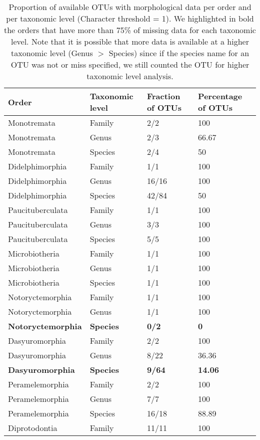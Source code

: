 \begin{longtable}{llll}
\caption{Proportion of available OTUs with morphological data per order and per taxonomic level (Character threshold = 1). We highlighted in bold the orders that have more than 75\% of missing data for each taxonomic level. Note that it is possible that more data is available at a higher taxonomic level (Genus $>$ Species) since if the species name for an OTU was not or miss specified, we still counted the OTU for higher taxonomic level analysis.} \\ 
  \hline
Order & Taxonomic level & Fraction of OTUs & Percentage of OTUs \\ 
  \hline
Monotremata & Family & 2/2 & 100 \\ 
  Monotremata & Genus & 2/3 & 66.67 \\ 
  Monotremata & Species & 2/4 & 50 \\ 
  Didelphimorphia & Family & 1/1 & 100 \\ 
  Didelphimorphia & Genus & 16/16 & 100 \\ 
  Didelphimorphia & Species & 42/84 & 50 \\ 
  Paucituberculata & Family & 1/1 & 100 \\ 
  Paucituberculata & Genus & 3/3 & 100 \\ 
  Paucituberculata & Species & 5/5 & 100 \\ 
  Microbiotheria & Family & 1/1 & 100 \\ 
  Microbiotheria & Genus & 1/1 & 100 \\ 
  Microbiotheria & Species & 1/1 & 100 \\ 
  Notoryctemorphia & Family & 1/1 & 100 \\ 
  Notoryctemorphia & Genus & 1/1 & 100 \\ 
  \textbf{Notoryctemorphia} & \textbf{Species} & \textbf{0/2} & \textbf{0} \\ 
  Dasyuromorphia & Family & 2/2 & 100 \\ 
  Dasyuromorphia & Genus & 8/22 & 36.36 \\ 
  \textbf{Dasyuromorphia} & \textbf{Species} & \textbf{9/64} & \textbf{14.06} \\ 
  Peramelemorphia & Family & 2/2 & 100 \\ 
  Peramelemorphia & Genus & 7/7 & 100 \\ 
  Peramelemorphia & Species & 16/18 & 88.89 \\ 
  Diprotodontia & Family & 11/11 & 100 \\ 

\end{longtable}
